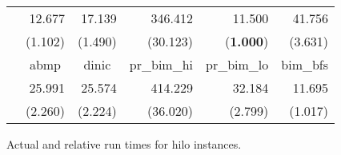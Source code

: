 \documentclass{article}
\begin{document}
\begin{figure}[ht]
\begin{center}
\begin{scriptsize}
\begin{tabular}{||c|r|r|r|r|r||}
    &   12.677  &   17.139  &   346.412 &   11.500  &   41.756  \\
    &   (1.102) &   (1.490) &   (30.123)    &   ({\bf 1.000})   &   (3.631) \\  \cline{2-6}
    &   \multicolumn{1}{|c|}{{\sf abmp}}    &   \multicolumn{1}{|c|}{{\sf dinic}}   &   \multicolumn{1}{|c|}{{\sf pr\_bim\_hi}} &   \multicolumn{1}{|c|}{{\sf pr\_bim\_lo}} &   \multicolumn{1}{|c||}{{\sf bim\_bfs}}   \\  \cline{2-6}
    &   25.991  &   25.574  &   414.229 &   32.184  &   11.695  \\
    &   (2.260) &   (2.224) &   (36.020)    &   (2.799) &   (1.017) \\  \hline
\hline
\end{tabular}
\end{scriptsize}
\caption{\label{Figure:hiloscaling} Actual and relative run times for {\sf hilo} instances.}
\end{center}
\end{figure}
\end{document}
